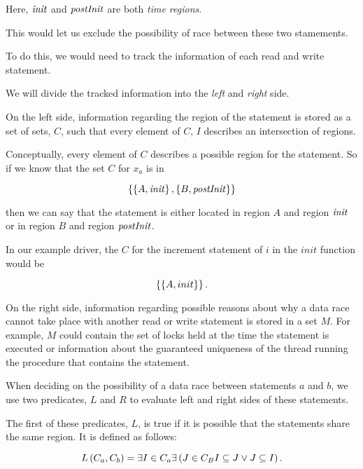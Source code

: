 \documentclass[..thesis.tex]{subfiles}
\begin{document}
Here, $\mathit{init}$ and $\mathit{postInit}$ are both \textit{time regions}.

This would let us exclude the possibility of race between these two stamements. 


To do this, we would need to track the information of each read and write statement.

We will divide the tracked information into the \textit{left} and \textit{right} side. 

On the left side, information regarding the region of the statement is stored as a set of sets, $C$,
such that every element of $C$, $I$ describes an intersection of regions.

Conceptually, every element of $C$ describes a possible region for the statement. So if we know that the set $C$ for $x_{a}$ is in
   
\begin{equation*}
\left\lbrace \left\lbrace A, \mathit{init} \right\rbrace, \left\lbrace B, \mathit{postInit} \right\rbrace \right\rbrace 
\end{equation*}

then we can say that the statement is either located in region $A$ and region $\mathit{init}$ or in region $B$ and region $\mathit{postInit}$. 

In our example driver, the $C$ for the increment statement of $i$ in the $init$ function would be 

\begin{equation*}
\left\lbrace \left\lbrace A, init \right\rbrace \right\rbrace \text{.}
\end{equation*} 

On the right side, information regarding possible reasons about why a data race cannot take place with another read or write statement is stored in a set $M$.
For example, $M$ could contain the set of locks held at the time the statement is executed or information about the guaranteed uniqueness of the thread running the procedure that contains the statement.

When deciding on the possibility of a data race between statements $a$ and $b$, we use two predicates, $L$ and $R$ to evaluate left and right sides of these statements. 


The first of these predicates, $L$, is true if it is possible that the statements share the same region. It is defined as follows:

\begin{equation*}
L \left( C_a, C_b \right) = \exists I \in C_a \exists \left( J \in C_B  I \subseteq J \lor J \subseteq I \right) \text{.}
\end{equation*}
\end{document}
